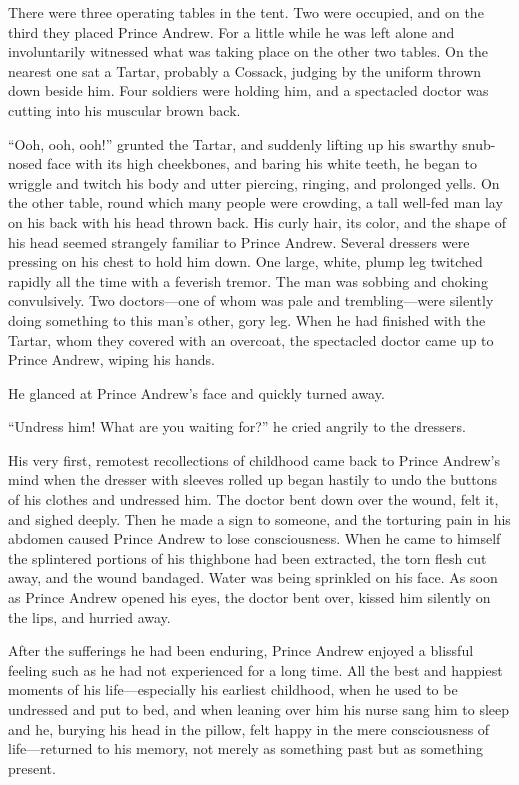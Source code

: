 There were three operating tables in the tent. Two were occupied,
and on the third they placed Prince Andrew. For a little while he
was left alone and involuntarily witnessed what was taking place
on the other two tables. On the nearest one sat a Tartar,
probably a Cossack, judging by the uniform thrown down beside
him. Four soldiers were holding him, and a spectacled doctor was
cutting into his muscular brown back.

``Ooh, ooh, ooh!'' grunted the Tartar, and suddenly lifting up
his swarthy snub-nosed face with its high cheekbones, and baring
his white teeth, he began to wriggle and twitch his body and
utter piercing, ringing, and prolonged yells. On the other table,
round which many people were crowding, a tall well-fed man lay on
his back with his head thrown back.  His curly hair, its color,
and the shape of his head seemed strangely familiar to Prince
Andrew. Several dressers were pressing on his chest to hold him
down. One large, white, plump leg twitched rapidly all the time
with a feverish tremor. The man was sobbing and choking
convulsively. Two doctors---one of whom was pale and
trembling---were silently doing something to this man's other,
gory leg. When he had finished with the Tartar, whom they covered
with an overcoat, the spectacled doctor came up to Prince Andrew,
wiping his hands.

He glanced at Prince Andrew's face and quickly turned away.

``Undress him! What are you waiting for?'' he cried angrily to
the dressers.

His very first, remotest recollections of childhood came back to
Prince Andrew's mind when the dresser with sleeves rolled up
began hastily to undo the buttons of his clothes and undressed
him. The doctor bent down over the wound, felt it, and sighed
deeply. Then he made a sign to someone, and the torturing pain in
his abdomen caused Prince Andrew to lose consciousness. When he
came to himself the splintered portions of his thighbone had been
extracted, the torn flesh cut away, and the wound bandaged. Water
was being sprinkled on his face. As soon as Prince Andrew opened
his eyes, the doctor bent over, kissed him silently on the lips,
and hurried away.

After the sufferings he had been enduring, Prince Andrew enjoyed
a blissful feeling such as he had not experienced for a long
time. All the best and happiest moments of his life---especially
his earliest childhood, when he used to be undressed and put to
bed, and when leaning over him his nurse sang him to sleep and
he, burying his head in the pillow, felt happy in the mere
consciousness of life---returned to his memory, not merely as
something past but as something present.

